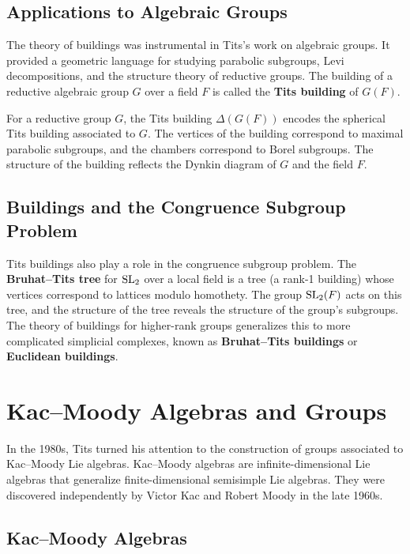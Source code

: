 \subsection{Applications to Algebraic Groups}

The theory of buildings was instrumental in Tits's work on algebraic groups. It provided a geometric language for studying parabolic subgroups, Levi decompositions, and the structure theory of reductive groups. The building of a reductive algebraic group \(G\) over a field \(F\) is called the \textbf{Tits building} of \(G(F)\).

For a reductive group \(G\), the Tits building \(\Delta(G(F))\) encodes the spherical Tits building associated to \(G\). The vertices of the building correspond to maximal parabolic subgroups, and the chambers correspond to Borel subgroups. The structure of the building reflects the Dynkin diagram of \(G\) and the field \(F\).

\subsection{Buildings and the Congruence Subgroup Problem}

Tits buildings also play a role in the congruence subgroup problem. The \textbf{Bruhat--Tits tree} for \(\operatorname{SL}_2\) over a local field is a tree (a rank-1 building) whose vertices correspond to lattices modulo homothety. The group \(\operatorname{SL}_2(F)\) acts on this tree, and the structure of the tree reveals the structure of the group's subgroups. The theory of buildings for higher-rank groups generalizes this to more complicated simplicial complexes, known as \textbf{Bruhat--Tits buildings} or \textbf{Euclidean buildings}.

\section{Kac--Moody Algebras and Groups}

In the 1980s, Tits turned his attention to the construction of groups associated to Kac--Moody Lie algebras. Kac--Moody algebras are infinite-dimensional Lie algebras that generalize finite-dimensional semisimple Lie algebras. They were discovered independently by Victor Kac and Robert Moody in the late 1960s.

\subsection{Kac--Moody Algebras}

